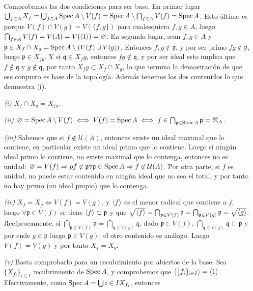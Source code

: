 \documentclass[../main.tex]{subfiles}
\begin{document}
Comprobamos las dos condiciones para ser base. En primer lugar $\bigcup_{f\in A}X_f = \bigcup_{f\in A}\operatorname{Spec} A \setminus V(f) = \operatorname{Spec} A \setminus \bigcap_{f\in A}V(f) = \operatorname{Spec} A$. Esto último es porque $V(f)\cap V(g) = V(\{f,g\})$ para cualesquiera $f,g \in A$, luego $\bigcap_{f\in A}V(f) = V(A) = V(\langle 1 \rangle) = \varnothing$. En segundo lugar, sean $f, g \in A$ y $\mathfrak p \in X_f\cap X_g = \operatorname{Spec} A \setminus (V(f) \cup V(g))$. Entonces $f, g\not\in \mathfrak p$, y por ser primo $fg \not \in \mathfrak p$, luego $\mathfrak p \in X_{fg}$. Y si $\mathfrak q \in X_fg$, entonces $fg \not \in \mathfrak q$, y por ser ideal esto implica que $f \not \in \mathfrak q$ y $g \not \in \mathfrak q$, por tanto $X_fg \subset X_f \cap X_g$, lo que termina la demostración de que ese conjunto es base de la topología. Además tenemos los dos contenidos lo que demuestra (i).

\textit{(i)} $X_f \cap X_g = X_{fg}$.

\textit{(ii)} $\varnothing = \operatorname{Spec} A \setminus V(f) \iff V(f) = \operatorname{Spec} A \iff f \in \bigcap_{\mathfrak p \in \operatorname{Spec} A} \mathfrak p = \mathfrak N_A$.

\textit{(iii)} Sabemos que si $f\not\in \mathcal U(A)$, entonces existe un ideal maximal que lo contiene, en particular existe un ideal primo que lo contiene. Luego si ningún ideal primo lo contiene, no existe maximal que lo contenga, entonces no es unidad:  $\varnothing = V(f) \Rightarrow pf \not \in \mathfrak p \forall \mathfrak p \in \operatorname{Spec} A \Rightarrow f \not\in \mathcal U(A)$. Por otra parte, si $f$ es unidad, no puede estar contenido en ningún ideal que no sea el total, y por tanto no hay primo (un ideal propio) que lo contenga.

\textit{(iv)} $X_f = X_g \iff V(f) = V(g)$, y $\langle f \rangle$ es el menor radical que contiene a $f$, luego $\forall \mathfrak p \in V(f)$ se tiene $\langle f \rangle \subset \mathfrak p$ y que $\sqrt{\langle f \rangle} = \bigcap_{\mathfrak p \in V(f)} \mathfrak p = \bigcap_{\mathfrak p \in V(g)} \mathfrak{p} = \sqrt{\langle g \rangle}$.
Recíprocamente, si $\bigcap_{\mathfrak p \in V(f)} \mathfrak p = \bigcap_{\mathfrak q \in V(g)} \mathfrak{q}$, dado $\mathfrak p \in V(f)$, $ \bigcap_{\mathfrak{q} \in V(g)} \mathfrak{q} \subset \mathfrak{p}$ y por ende $g \in \mathfrak p$ luego $\mathfrak p \in V(g)$; el otro contenido es análogo. Luego $V(f) = V(g)$ y por tanto $X_f = X_g$.

\textit{(v)} Basta comprobarlo para un recubrimiento por abiertos de la base. Sea $\{X_{f_i}\}_{i\in I}$ recubrimiento de $\operatorname{Spec} A$, y comprobemos que $\langle \{f_i\}_{i\in I} \rangle = \langle 1 \rangle$. Efectivamente, como $\operatorname{Spec} A = \bigcup{i\in I}X_{f_i} $, entonces
\end{document}
